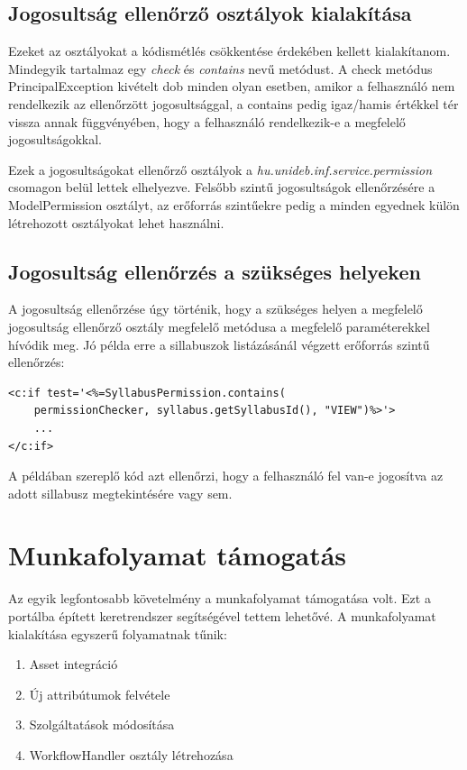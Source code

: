 \documentclass[hidelinks, 12pt, a4paper]{report}
\begin{document}
\subsection{Jogosultság ellenőrző osztályok kialakítása}

Ezeket az osztályokat a kódismétlés csökkentése érdekében kellett kialakítanom. Mindegyik tartalmaz egy \emph{check} és \emph{contains} nevű metódust. A check metódus PrincipalException kivételt dob minden olyan esetben, amikor a felhasználó nem rendelkezik az ellenőrzött jogosultsággal, a contains pedig igaz/hamis értékkel tér vissza annak függvényében, hogy a felhasználó rendelkezik-e a megfelelő jogosultságokkal.

Ezek a jogosultságokat ellenőrző osztályok a \emph{hu.unideb.inf.service.permission} csomagon belül lettek elhelyezve. Felsőbb szintű jogosultságok ellenőrzésére a ModelPermission osztályt, az erőforrás szintűekre pedig a minden egyednek külön létrehozott osztályokat lehet használni.

\subsection{Jogosultság ellenőrzés a szükséges helyeken}

A jogosultság ellenőrzése úgy történik, hogy a szükséges helyen a megfelelő jogosultság ellenőrző osztály megfelelő metódusa a megfelelő paraméterekkel hívódik meg. Jó példa erre a sillabuszok listázásánál végzett erőforrás szintű ellenőrzés:

\begin{minipage}{\linewidth}
\begin{lstlisting}[basicstyle=\small]
<c:if test='<%=SyllabusPermission.contains(
	permissionChecker, syllabus.getSyllabusId(), "VIEW")%>'>
	...
</c:if>
\end{lstlisting}
\end{minipage}

\noindent A példában szereplő kód azt ellenőrzi, hogy a felhasználó fel van-e jogosítva az adott sillabusz megtekintésére vagy sem.

\section{Munkafolyamat támogatás}

Az egyik legfontosabb követelmény a munkafolyamat támogatása volt. Ezt a portálba épített keretrendszer segítségével tettem lehetővé. A munkafolyamat kialakítása egyszerű folyamatnak tűnik:
\begin{enumerate}
\item Asset integráció
\item Új attribútumok felvétele
\item Szolgáltatások módosítása
\item WorkflowHandler osztály létrehozása
\end{enumerate}
\end{document}
